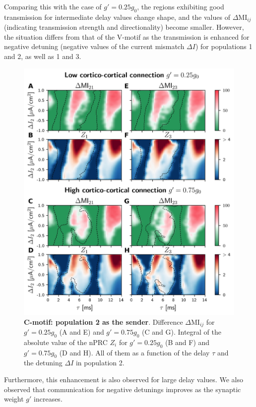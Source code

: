 \documentclass[../main.tex]{subfiles}
\begin{document}
Comparing this with the case of $g' = 0.25 g_0$, the regions exhibiting good transmission for intermediate delay values change shape, and the values of $\Delta$MI$_{ij}$ (indicating transmission strength and directionality) become smaller.
However, the situation differs from that of the V-motif as the transmission is enhanced for negative detuning (negative values of the current mismatch $\Delta I$) for populations 1 and 2, as well as 1 and 3.
\begin{figure}[!htb]
 \centering
    \includegraphics[width=\textwidth]{chapter2/figures/fig8}
    \caption{\textbf{C-motif: population 2 as the sender}.
    Difference $\Delta$MI$_{ij}$ for $g'=0.25g_0$ (A and E) and $g'=0.75g_0$ (C and G).
    Integral of the absolute value of the nPRC $Z_i$ for $g'=0.25g_0$ (B and F) and $g'=0.75g_0$ (D and H).
    All of them as a function of the delay $\tau$ and the detuning $\Delta I$ in population 2.}
    \label{fig:cmotif_signal_2}
\end{figure}
Furthermore, this enhancement is also observed for large delay values.
We also observed that communication for negative detunings improves as the synaptic weight $g'$ increases. %
\end{document}
